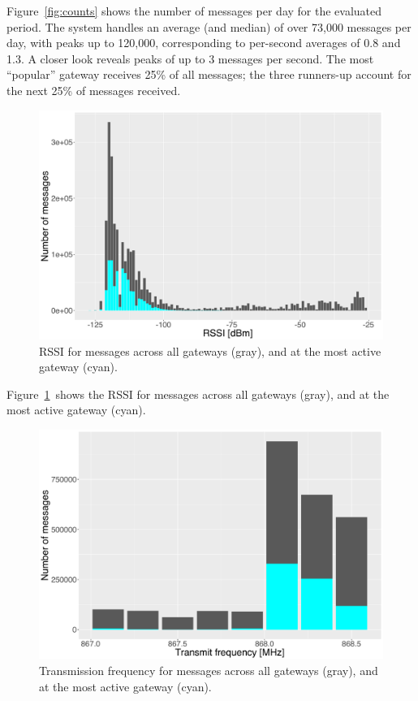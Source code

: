 Figure~\ref{fig:counts} shows the number of messages per day for the
evaluated period. The system handles an average (and median) of over
73,000 messages per day, with peaks up to 120,000, corresponding to
per-second averages of 0.8 and 1.3. A closer look reveals peaks
of up to 3 messages per second. The most ``popular'' gateway
receives 25\% of all messages; the three runners-up account for
the next 25\% of messages received.

\begin{figure}
  \centering
  \includegraphics[width=\columnwidth]{figures/rssi.pdf}
  \caption{\acrshort{RSSI} for messages across all gateways (gray), and at the most active gateway (cyan).}
  \label{fig:rssi}
\end{figure}

Figure~\ref{fig:rssi} shows the \gls{RSSI} for messages across all
gateways (gray), and at the most active gateway (cyan).





\begin{figure}
  \centering
  \includegraphics[width=\columnwidth]{figures/qrg.pdf}
  \caption{Transmission frequency for messages across all gateways (gray), and at the most active gateway (cyan).}
  \label{fig:qrg}
\end{figure}

